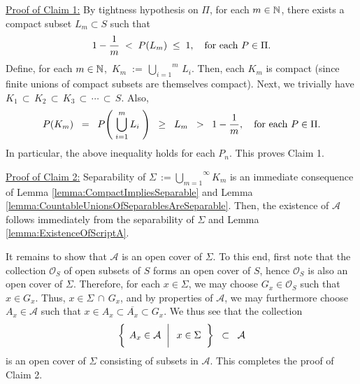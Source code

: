 \vskip 0.5cm
\noindent
\underline{Proof of Claim 1:}\quad
By tightness hypothesis on $\Pi$,
for each $m \in \mathbb{N}$,
there exists a compact subset $L_{m} \subset S$ such that
\begin{equation*}
1 - \dfrac{1}{m} \; < \; P(L_{m}) \; \leq \; 1,
\quad
\textnormal{for each $P \in \Pi$}.
\end{equation*}
Define, for each $m \in \mathbb{N}$,
\,$K_{m} \; := \, \overset{m}{\underset{i=1}{\bigcup}}\,L_{i}$.
Then, each $K_{m}$ is compact (since finite unions of compact subsets are themselves compact).
Next, we trivially have\;
$K_{1} \,\subset\, K_{2} \,\subset\, K_{3} \,\subset\, \cdots \,\subset\, S$.
Also,
\begin{equation*}
P(K_{m})
\;\;=\;\; P\!\left(\;\bigcup_{i=1}^{m}L_{i}\;\right)
\;\;\geq\;\; L_{m}
\;\; > \;\; 1 - \dfrac{1}{m},
\quad
\textnormal{for each $P \in \Pi$}.
\end{equation*}
In particular, the above inequality holds for each $P_{n}$. This proves Claim 1.


\vskip 0.5cm
\noindent
\underline{Proof of Claim 2:}\quad
Separability of $\Sigma \,:= \overset{\infty}{\underset{m=1}{\bigcup}}K_{m}$
is an immediate consequence of
Lemma \ref{lemma:CompactImpliesSeparable} and
Lemma \ref{lemma:CountableUnionsOfSeparablesAreSeparable}.
Then, the existence of $\mathcal{A}$ follows immediately
from the separability of $\Sigma$
and Lemma \ref{lemma:ExistenceOfScriptA}.

\vskip 0.3cm
\noindent
It remains to show that $\mathcal{A}$ is an open cover of $\Sigma$.
To this end, first note that the collection $\mathcal{O}_{S}$ of open subsets of $S$
forms an open cover of $S$, hence $\mathcal{O}_{S}$ is also an open cover of $\Sigma$.
Therefore, for each $x \in \Sigma$, we may choose $G_{x} \in \mathcal{O}_{S}$
such that $x \in G_{x}$.
Thus, $x \in \Sigma\,\cap\,G_{x}$, and by properties of $\mathcal{A}$,
we may furthermore choose $A_{x} \in \mathcal{A}$ such that
$x \in A_{x} \subset \overline{A_{x}} \subset G_{x}$.
We thus see that the collection
\begin{equation*}
\left\{\;
\left.
A_{x} \in \overset{{\color{white}u}}{\mathcal{A}}
\;\;\right\vert\;\;
x \in \Sigma
\;\;\right\}
\;\; \subset \;\; \mathcal{A}
\end{equation*}
is an open cover of $\Sigma$ consisting of subsets in $\mathcal{A}$.
This completes the proof of Claim 2.

